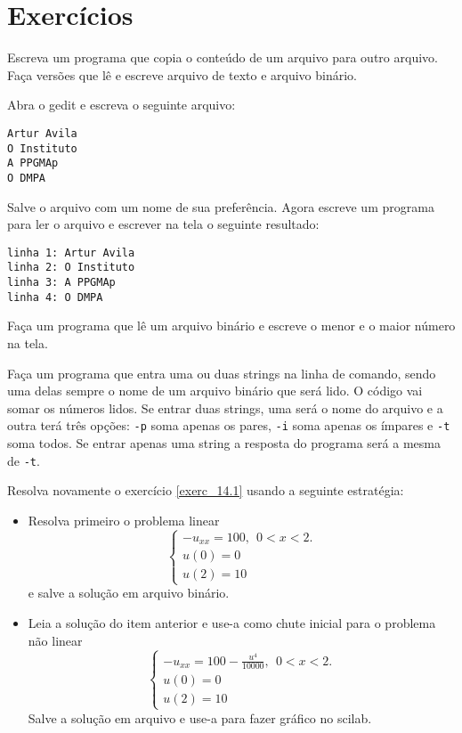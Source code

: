 \section{Exercícios}

\begin{exer}
Escreva um programa que copia o conteúdo de um arquivo para outro arquivo. Faça versões que lê e escreve arquivo de texto e arquivo binário.
\end{exer}
\begin{exer}
Abra o gedit e escreva o seguinte arquivo:
\begin{verbatim}
Artur Avila
O Instituto
A PPGMAp
O DMPA
\end{verbatim}
Salve o arquivo com um nome de sua preferência. Agora escreve um programa para ler o arquivo e escrever na tela o seguinte resultado:
\begin{verbatim}
linha 1: Artur Avila
linha 2: O Instituto
linha 3: A PPGMAp
linha 4: O DMPA
\end{verbatim}
\end{exer}
\begin{exer}
Faça um programa que lê um arquivo binário e escreve o menor e o maior número na tela. 
\end{exer}
\begin{exer}
Faça um programa que entra uma ou duas strings na linha de comando, sendo uma delas sempre o nome de um arquivo binário que será lido. O código vai somar os números lidos. Se entrar duas strings, uma será o nome do arquivo e a outra terá três opções: \verb|-p| soma apenas os pares, \verb|-i| soma apenas os ímpares e \verb|-t| soma todos. Se entrar apenas uma string a resposta do programa será a mesma de \verb|-t|.
\end{exer}
 
\begin{exer}
Resolva novamente o exercício \ref{exerc_14.1} usando a seguinte estratégia:
\begin{itemize}
 \item Resolva primeiro o problema linear
 $$\left\{\begin{array}{l}-u_{xx}=100,~~ 0<x<2.\\
u(0)=0\\
u(2)=10\end{array}
\right.
$$
e salve a solução em arquivo binário.
 \item Leia a solução do item anterior e use-a como chute inicial para o problema não linear
 $$\left\{\begin{array}{l}-u_{xx}=100- \frac{u^4}{10000},~~ 0<x<2.\\
u(0)=0\\
u(2)=10\end{array}
\right.
$$
Salve a solução em arquivo e use-a para fazer gráfico no scilab.
\end{itemize}
\end{exer}

